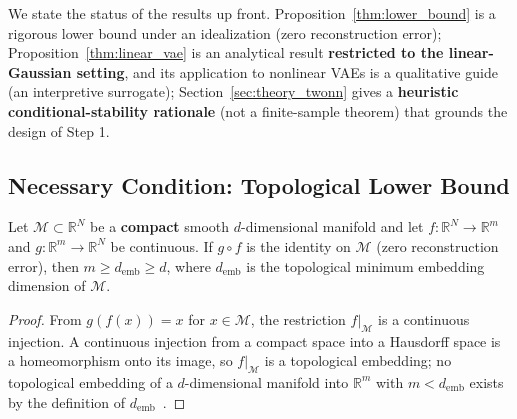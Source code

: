 \documentclass[make,article,submit,pdftex,moreauthors]{Definitions/mdpi}
\newcommand{\R}{\mathbb{R}}
\newcommand{\demb}{d_{\mathrm{emb}}}
\begin{document}
We state the status of the results up front.
Proposition~\ref{thm:lower_bound} is a rigorous lower bound under an
idealization (zero reconstruction error);
Proposition~\ref{thm:linear_vae} is an analytical result
\textbf{restricted to the linear-Gaussian setting}, and its application to
nonlinear VAEs is a qualitative guide (an interpretive surrogate);
Section~\ref{sec:theory_twonn} gives a \textbf{heuristic
conditional-stability rationale} (not a finite-sample theorem) that
grounds the design of Step 1.

\subsection{Necessary Condition: Topological Lower Bound}\label{sec:theory_lower}

\begin{Proposition}\label{thm:lower_bound}
Let $\mathcal{M} \subset \R^N$ be a \textbf{compact} smooth $d$-dimensional
manifold and let $f: \R^N \to \R^m$ and $g: \R^m \to \R^N$ be continuous.
If $g \circ f$ is the identity on $\mathcal{M}$ (zero reconstruction
error), then $m \geq \demb \geq d$, where $\demb$ is the topological
minimum embedding dimension of $\mathcal{M}$.
\end{Proposition}

\begin{proof}
From $g(f(x)) = x$ for $x \in \mathcal{M}$, the restriction
$f|_\mathcal{M}$ is a continuous injection.
A continuous injection from a compact space into a Hausdorff space is a
homeomorphism onto its image, so $f|_\mathcal{M}$ is a topological
embedding; no topological embedding of a $d$-dimensional manifold into
$\R^m$ with $m < \demb$ exists by the definition of
$\demb$~\cite{hatcher2002algebraic}.
\end{proof}
\end{document}
